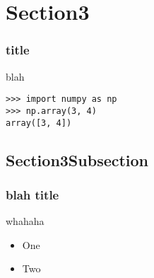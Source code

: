 \documentclass{beamer}
\begin{document}
\section{Section3}


\begin{frame}[fragile]
    \frametitle{title}
    \begin{block}{blah}
        \begin{verbatim}
>>> import numpy as np
>>> np.array(3, 4)
array([3, 4])
        \end{verbatim}
    \end{block}
\end{frame}

\subsection{Section3Subsection}

\begin{frame}[fragile]
    \frametitle{blah title}
    \begin{block}{whahaha}
        \begin{itemize}
            \item One 
            \item Two
        \end{itemize}
    \end{block}
\end{frame}
\end{document}
